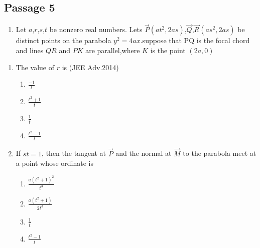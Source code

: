 \documentclass[journal]{IEEEtran}
\numberwithin{equation}{enumi}
\numberwithin{figure}{enumi}
\begin{document}
\subsection*{Passage 5}
\begin{enumerate}
\item[] Let $a$,$r$,$s$,$t$ be nonzero real numbers. Lets $\Vec{P}$$(at^2,2as)$,$\Vec{Q}$,$\Vec{R}$$(as^2,2as)$ be distinct points on the parabola $y^2=4ax$.suppose that PQ is the focal chord and lines $QR$ and $PK$ are parallel,where $K$ is the point $(2a,0)$
\end{enumerate}
\begin{enumerate}
\item The value of $r$ is 
\hfill(JEE Adv.2014)
\begin{enumerate}
    \item $\frac{-1}{t}$ 
    \item $\frac{t^2+1}{t}$
    \item $\frac{1}{t}$
    \item $\frac{t^2-1}{t}$
\end{enumerate}
\item If $st=1$, then the tangent at $\Vec{P}$ and the normal at $\Vec{M}$ to the
parabola meet at a point whose ordinate is 
\begin{enumerate}
    \item $\frac{a(t^2+1)^2}{t^3}$
    \item $\frac{a(t^2+1)}{2t^3}$
    \item $\frac{1}{t}$
    \item $\frac{t^2-1}{t}$
    \end{enumerate}
\end{enumerate}
\end{document}
